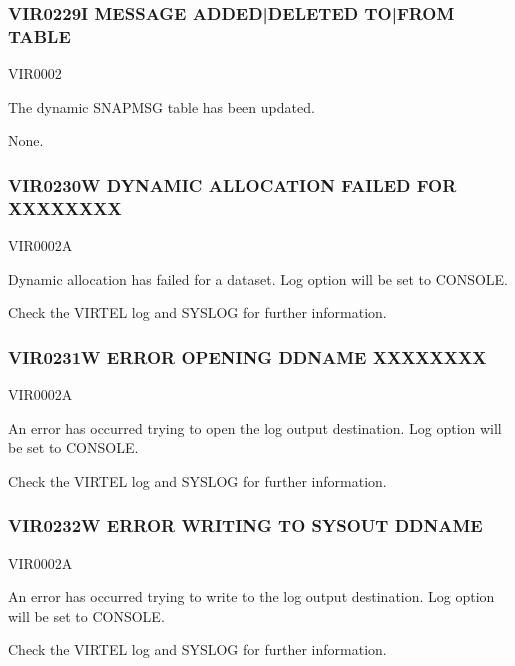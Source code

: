 \documentclass[letterpaper,10pt,english]{sphinxmanual}
\begin{document}
\subsubsection{VIR0229I MESSAGE ADDED|DELETED TO|FROM TABLE}
\label{\detokenize{messages:vir0229i-message-added-deleted-to-from-table}}\begin{description}
\sphinxAtStartPar
VIR0002

\sphinxAtStartPar
The dynamic SNAPMSG table has been updated.

\sphinxAtStartPar
None.

\end{description}


\subsubsection{VIR0230W DYNAMIC ALLOCATION FAILED FOR XXXXXXXX}
\label{\detokenize{messages:vir0230w-dynamic-allocation-failed-for-xxxxxxxx}}\begin{description}
\sphinxAtStartPar
VIR0002A

\sphinxAtStartPar
Dynamic allocation has failed for a dataset. Log option will be set to CONSOLE.

\sphinxAtStartPar
Check the VIRTEL log and SYSLOG for further information.

\end{description}


\subsubsection{VIR0231W ERROR OPENING DDNAME XXXXXXXX}
\label{\detokenize{messages:vir0231w-error-opening-ddname-xxxxxxxx}}\begin{description}
\sphinxAtStartPar
VIR0002A

\sphinxAtStartPar
An error has occurred trying to open the log output destination. Log option will be set to CONSOLE.

\sphinxAtStartPar
Check the VIRTEL log and SYSLOG for further information.

\end{description}


\subsubsection{VIR0232W ERROR WRITING TO SYSOUT DDNAME}
\label{\detokenize{messages:vir0232w-error-writing-to-sysout-ddname}}\begin{description}
\sphinxAtStartPar
VIR0002A

\sphinxAtStartPar
An error has occurred trying to write to the log output destination. Log option will be set to CONSOLE.

\sphinxAtStartPar
Check the VIRTEL log and SYSLOG for further information.

\end{description}
\end{document}
